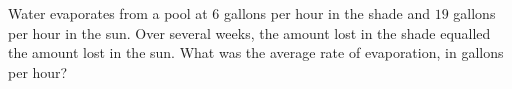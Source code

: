 Water evaporates from a pool at $6$ gallons per hour in the shade and $19$ gallons per hour in the sun. Over several weeks, the amount lost in the shade equalled the amount lost in the sun. What was the average rate of evaporation, in gallons per hour?
